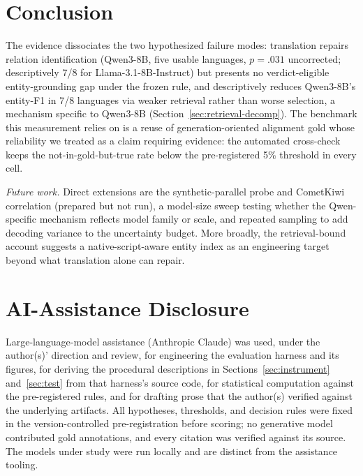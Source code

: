\documentclass{llncs}
\begin{document}
\section{Conclusion}\label{sec:conclusion}
The
evidence dissociates the two hypothesized failure modes: translation repairs relation identification
(Qwen3-8B, five usable languages, $p=.031$ uncorrected; descriptively 7/8 for
Llama-3.1-8B-Instruct) but presents no verdict-eligible entity-grounding gap
under the frozen rule, and descriptively reduces Qwen3-8B's entity-F1 in 7/8
languages via weaker retrieval rather than worse selection, a mechanism
specific to Qwen3-8B (Section~\ref{sec:retrieval-decomp}). The benchmark
this measurement relies on is a reuse of generation-oriented alignment gold
whose reliability we treated as a claim requiring evidence: the automated
cross-check keeps the not-in-gold-but-true rate below the pre-registered
5\% threshold in every cell.

\emph{Future work.} Direct extensions are the synthetic-parallel probe and
CometKiwi correlation (prepared but not run), a model-size sweep testing
whether the Qwen-specific mechanism reflects model family or scale, and
repeated sampling to add decoding variance to the uncertainty budget. More
broadly, the retrieval-bound account suggests a native-script-aware entity
index as an engineering target beyond what translation alone can repair.

\section*{AI-Assistance Disclosure}
Large-language-model assistance (Anthropic Claude) was used, under the
author(s)' direction and review, for engineering the evaluation harness and
its figures, for deriving the procedural descriptions in
Sections~\ref{sec:instrument} and~\ref{sec:test} from that harness's source
code, for statistical computation against the pre-registered rules, and for
drafting prose that the author(s) verified against the underlying
artifacts. All hypotheses,
thresholds, and decision rules were fixed in the version-controlled
pre-registration before scoring; no generative model contributed gold
annotations, and every citation was verified against its source. The models
under study were run locally and are distinct from the assistance tooling.



\end{document}
